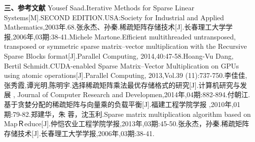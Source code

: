 \documentclass{article}
\begin{document}
\textbf{三、参考文献}
      \qquad
\newline
 [1]Yousef Saad.Iterative Methods for Sparse Linear Systems[M].SECOND EDITION.USA:Society for Industrial and Applied Mathematics,2003年.68.\newline
 [2]张永杰、孙秦.稀疏矩阵存储技术[J].长春理工大学学报,2006年,03期:38-41.\newline
  [x]Michele Martone.Efficient multithreaded untransposed, transposed or symmetric sparse matrix–vector multiplication with the Recursive Sparse Blocks format[J].Parallel Computing, 2014,40:47-58.\newline
   [y]Hoang-Vu Dang,  Bertil Schmidt.CUDA-enabled Sparse Matrix–Vector Multiplication on GPUs
using atomic operations[J].Parallel Computing, 2013,Vol.39 (11):737-750.\newline
  [a]李佳佳,张秀霞,谭光明,陈明宇.选择稀疏矩阵乘法最优存储格式的研究[J].计算机研究与发展 , Journal of Computer Research and Developmen,2014年,04期:882-894.\newline
[b]付朝江.基于贪婪分配的稀疏矩阵与向量乘的负载平衡[J].福建工程学院学报 ,2010年,01期:79-82.\newline
[d]郑建华，朱 蓉，沈玉利.Sparse matrix multiplication algorithm based on MapＲeduce[J].仲恺农业工程学院学报,2013年,03期:45-50.\newline
[f]张永杰，孙秦.稀疏矩阵存储技术[J].长春理工大学学报,2006年,03期:38-41.\newline
\end{document}

